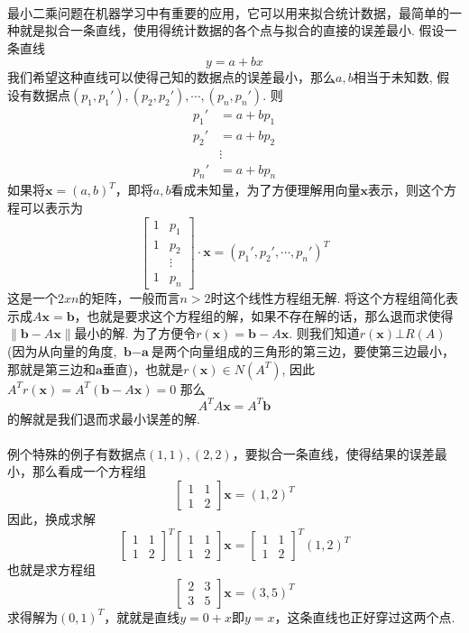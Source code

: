 \paragraph{}
最小二乘问题在机器学习中有重要的应用，它可以用来拟合统计数据，最简单的一种就是拟合一条直线，使用得统计数据的各个点与拟合的直接的误差最小. 假设一条直线
$$
y = a + bx
$$
我们希望这种直线可以使得己知的数据点的误差最小，那么$a, b$相当于未知数, 假设有数据点$(p_1, p_1'), (p_2, p_2'), \cdots, (p_n, p_n')$.  则
\begin{align*}
p_1' & = a + b p_1 \\
p_2' & = a + b p_2 \\
        & \vdots \\
p_n' & = a + b p_n 
\end{align*}
如果将$\textbf{x} = (a, b)^T$，即将$a, b$看成未知量，为了方便理解用向量$\textbf{x}$表示，则这个方程可以表示为
$$
\begin{bmatrix}
1 & p_1 \\
1 & p_2 \\
   & \vdots \\
1 & p_n 
\end{bmatrix} \cdot \textbf{x} = (p_1', p_2', \cdots, p_n')^T
$$
这是一个$2xn$的矩阵，一般而言$n > 2$时这个线性方程组无解. 将这个方程组简化表示成$A\textbf{x} = \textbf{b}$，也就是要求这个方程组的解，如果不存在解的话，那么退而求使得$\parallel \textbf{b} - A\textbf{x} \parallel$最小的解. 为了方便令$r(\textbf{x}) = \textbf{b} - A\textbf{x}$. 则我们知道$r(\textbf{x}) \bot R(A)$(因为从向量的角度, $\textbf{b} - \textbf{a}$是两个向量组成的三角形的第三边，要使第三边最小，那就是第三边和$\textbf{a}$垂直)，也就是$r(\textbf{x}) \in N(A^T)$, 因此$A^T r(\textbf{x}) = A^T (\textbf{b} - A\textbf{x}) = 0$
那么
$$
A^T A \textbf{x} =  A^T\textbf{b}
$$
的解就是我们退而求最小误差的解.

\paragraph{}
例个特殊的例子有数据点$(1,1), (2,2)$，要拟合一条直线，使得结果的误差最小，那么看成一个方程组
$$
\begin{bmatrix}
1 & 1 \\
1 & 2
\end{bmatrix} \textbf{x} = (1, 2)^T
$$
因此，换成求解
$$
\begin{bmatrix}
1 & 1 \\
1 & 2
\end{bmatrix}^T \begin{bmatrix}
1 & 1 \\
1 & 2
\end{bmatrix} \textbf{x} = \begin{bmatrix}
1 & 1 \\
1 & 2
\end{bmatrix}^T (1, 2)^T
$$
也就是求方程组
$$
\begin{bmatrix}
2 & 3 \\
3 & 5
\end{bmatrix} \textbf{x} = (3, 5)^T
$$
求得解为$(0, 1)^T$，就就是直线$y = 0 + x$即$y = x$，这条直线也正好穿过这两个点.

